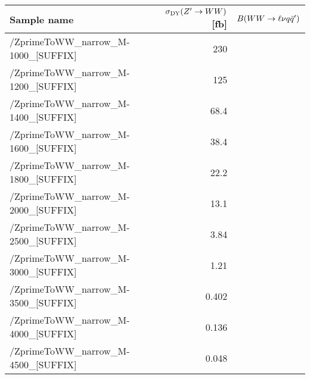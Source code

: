 \scriptsize
\begin{tabular}{lrr}
  \hline
  \textbf{Sample name} & $\sigma_{\mathrm{DY}}(Z'\to WW)$ [fb] & $B(WW\to\ell\nu q\bar{q}')$ \\
  \hline
  \ttfamily /ZprimeToWW\_narrow\_M-1000\_[SUFFIX] & 230  \\
  \ttfamily /ZprimeToWW\_narrow\_M-1200\_[SUFFIX] & 125  \\
  \ttfamily /ZprimeToWW\_narrow\_M-1400\_[SUFFIX] & 68.4  \\
  \ttfamily /ZprimeToWW\_narrow\_M-1600\_[SUFFIX] & 38.4  \\
  \ttfamily /ZprimeToWW\_narrow\_M-1800\_[SUFFIX] & 22.2  \\
  \ttfamily /ZprimeToWW\_narrow\_M-2000\_[SUFFIX] & 13.1  \\
  \ttfamily /ZprimeToWW\_narrow\_M-2500\_[SUFFIX] & 3.84  \\
  \ttfamily /ZprimeToWW\_narrow\_M-3000\_[SUFFIX] & 1.21  \\
  \ttfamily /ZprimeToWW\_narrow\_M-3500\_[SUFFIX] & 0.402  \\
  \ttfamily /ZprimeToWW\_narrow\_M-4000\_[SUFFIX] & 0.136  \\
  \ttfamily /ZprimeToWW\_narrow\_M-4500\_[SUFFIX] & 0.048  \\
  \hline
\end{tabular}
